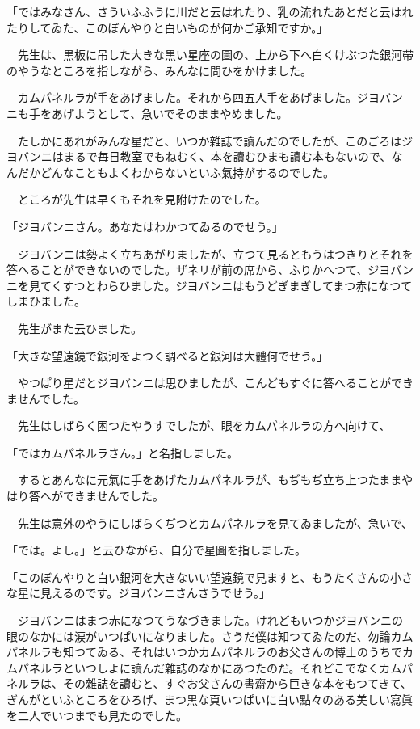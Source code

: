 \documentclass[tate,paper=b6j,jafontsize=9pt]{jlreq}
\begin{document}
\thispagestyle{empty}
\vspace*{\fill}
\zw
{}
\vfill
\newpage


「ではみなさん、さういふふうに川だと云はれたり、乳の流れたあとだと云はれたりしてゐた、このぼんやりと白いものが何かご承知ですか。」

　先生は、黒板に吊した大きな黒い星座の圖の、上から下へ白くけぶつた銀河帶のやうなところを指しながら、みんなに問ひをかけました。

　カムパネルラが手をあげました。それから四五人手をあげました。ジヨバンニも手をあげようとして、急いでそのままやめました。

　たしかにあれがみんな星だと、いつか雜誌で讀んだのでしたが、このごろはジヨバンニはまるで毎日教室でもねむく、本を讀むひまも讀む本もないので、なんだかどんなこともよくわからないといふ氣持がするのでした。

　ところが先生は早くもそれを見附けたのでした。

「ジヨバンニさん。あなたはわかつてゐるのでせう。」

　ジヨバンニは勢よく立ちあがりましたが、立つて見るともうはつきりとそれを答へることができないのでした。ザネリが前の席から、ふりかへつて、ジヨバンニを見てくすつとわらひました。ジヨバンニはもうどぎまぎしてまつ赤になつてしまひました。

　先生がまた云ひました。

「大きな望遠鏡で銀河をよつく調べると銀河は大體何でせう。」

　やつぱり星だとジヨバンニは思ひましたが、こんどもすぐに答へることができませんでした。

　先生はしばらく困つたやうすでしたが、眼をカムパネルラの方へ向けて、

「ではカムパネルラさん。」と名指しました。

　するとあんなに元氣に手をあげたカムパネルラが、もぢもぢ立ち上つたままやはり答へができませんでした。

　先生は意外のやうにしばらくぢつとカムパネルラを見てゐましたが、急いで、

「では。よし。」と云ひながら、自分で星圖を指しました。

「このぼんやりと白い銀河を大きないい望遠鏡で見ますと、もうたくさんの小さな星に見えるのです。ジヨバンニさんさうでせう。」

　ジヨバンニはまつ赤になつてうなづきました。けれどもいつかジヨバンニの眼のなかには涙がいつぱいになりました。さうだ僕は知つてゐたのだ、勿論カムパネルラも知つてゐる、それはいつかカムパネルラのお父さんの博士のうちでカムパネルラといつしよに讀んだ雜誌のなかにあつたのだ。それどこでなくカムパネルラは、その雜誌を讀むと、すぐお父さんの書齋から巨きな本をもつてきて、ぎんがといふところをひろげ、まつ黒な頁いつぱいに白い點々のある美しい寫眞を二人でいつまでも見たのでした。
\end{document}
